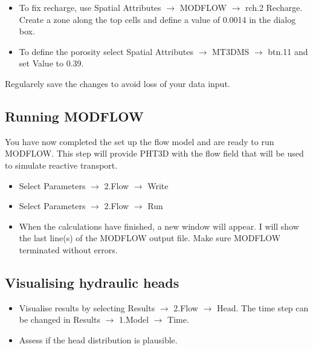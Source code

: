 \begin{itemize}
\item To fix recharge, use {\color{blue}Spatial Attributes} $\rightarrow$ 
{\color{blue}MODFLOW} $\rightarrow$ {\color{blue}rch.2 Recharge}. 
Create a zone along the top cells and define a value of 0.0014 in the dialog box.

\item To define the porosity select {\color{blue}Spatial Attributes} 
$\rightarrow$ {\color{blue}MT3DMS} $\rightarrow$ {\color{blue}btn.11} and 
set {\color{blue}Value} to 0.39. 

\end{itemize}

Regularely save the changes to avoid loss of your data input.

\subsection{Running MODFLOW}

You have now completed the set up the flow model and are ready to run MODFLOW.
This step will provide PHT3D with the flow field that will be used to simulate 
reactive transport.

\begin{itemize}

\item Select {\color{blue}Parameters} $\rightarrow$ {\color{blue}2.Flow} $\rightarrow$ {\color{blue}Write}

\item Select {\color{blue}Parameters} $\rightarrow$ {\color{blue}2.Flow} $\rightarrow$ {\color{blue}Run}

\item When the calculations have finished, a new window will appear. I will show the last line(s) of the MODFLOW output file. Make sure MODFLOW terminated without errors.

\end{itemize}

\subsection{Visualising hydraulic heads}

\begin{itemize}

\item Visualise results by selecting {\color{blue}Results} $\rightarrow$ {\color{blue}2.Flow} $\rightarrow$ {\color{blue}Head}. The time step can be changed
in {\color{blue}Results} $\rightarrow$ {\color{blue}1.Model} $\rightarrow$ {\color{blue}Time}.

\item Assess if the head distribution is plausible.

\end{itemize}

